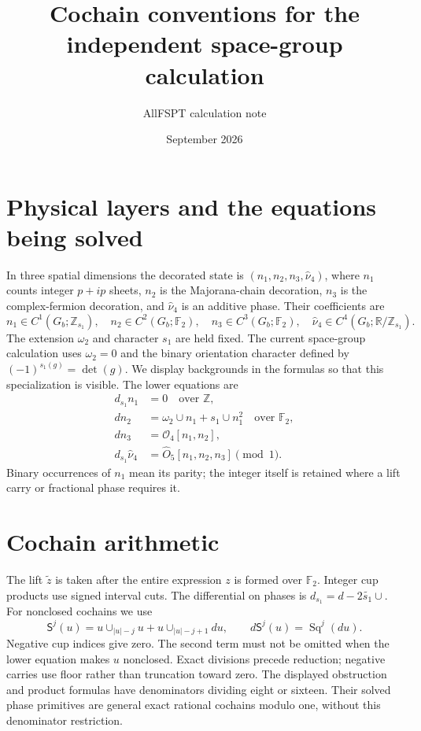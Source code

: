 \documentclass[11pt]{article}
\title{Cochain conventions for the independent space-group calculation}
\author{AllFSPT calculation note}
\date{September 2026}
\newcommand{\F}{\mathbb F_2}
\newcommand{\Z}{\mathbb Z}
\newcommand{\R}{\mathbb R}
\newcommand{\Sq}{\operatorname{Sq}}
\newcommand{\SSq}{\mathsf S}
\newcommand{\dd}{d_{s_1}}
\newcommand{\lift}[1]{\widetilde{#1}}
\begin{document}
\maketitle

\section{Physical layers and the equations being solved}
In three spatial dimensions the decorated state is
$(n_1,n_2,n_3,\widehat\nu_4)$, where $n_1$ counts integer $p+ip$ sheets,
$n_2$ is the Majorana-chain decoration, $n_3$ is the complex-fermion
decoration, and $\widehat\nu_4$ is an additive phase. Their coefficients are
\begin{equation}
 n_1\in C^1(G_b;\Z_{s_1}),\quad n_2\in C^2(G_b;\F),\quad
 n_3\in C^3(G_b;\F),\quad\widehat\nu_4\in C^4(G_b;\R/\Z_{s_1}).
\end{equation}
The extension $\omega_2$ and character $s_1$ are held fixed. The current
space-group calculation uses $\omega_2=0$ and the binary orientation character
defined by $(-1)^{s_1(g)}=\det(g)$.
We display backgrounds in the formulas so that this specialization is
visible. The lower equations are
\begin{align}
 \dd n_1&=0\quad\text{over }\Z,\\
 dn_2&=\omega_2\cup n_1+s_1\cup n_1^2\quad\text{over }\F,\\
 dn_3&=\mathcal O_4[n_1,n_2],\\
 \dd\widehat\nu_4&=\widehat O_5[n_1,n_2,n_3]\pmod1.
\end{align}
Binary occurrences of $n_1$ mean its parity; the integer itself is retained
where a lift carry or fractional phase requires it.

\section{Cochain arithmetic}
The lift $\lift z$ is taken after the entire expression $z$ is formed over
$\F$. Integer cup products use signed interval cuts. The differential on
phases is $\dd=d-2\lift{s_1}\cup$. For nonclosed cochains we use
\begin{equation}
 \SSq^j(u)=u\cup_{|u|-j}u+u\cup_{|u|-j+1}du,
 \qquad d\SSq^j(u)=\Sq^j(du).
\end{equation}
Negative cup indices give zero. The second term must not be omitted when
the lower equation makes $u$ nonclosed. Exact divisions precede reduction;
negative carries use floor rather than truncation toward zero.
The displayed obstruction and product formulas have denominators dividing
eight or sixteen. Their solved phase primitives are general exact rational
cochains modulo one, without this denominator restriction.
\end{document}
